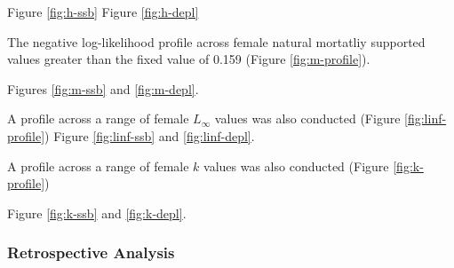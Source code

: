 \documentclass[11pt,
  english,
  a4paper,
]{article}
\begin{document}

Figure \ref{fig:h-ssb} Figure \ref{fig:h-depl}

\leavevmode\tagmcend\tagstructend\par


The negative log-likelihood profile across female natural mortatliy supported values greater than the fixed value of 0.159 (Figure \ref{fig:m-profile}).

\leavevmode\tagmcend\tagstructend\par


Figures \ref{fig:m-ssb} and \ref{fig:m-depl}.

\leavevmode\tagmcend\tagstructend\par


A profile across a range of female {\(L_{\infty}\)\leavevmode\tagmcend\tagstructend} values was also conducted (Figure \ref{fig:linf-profile}) Figure \ref{fig:linf-ssb} and \ref{fig:linf-depl}.

\leavevmode\tagmcend\tagstructend\par


A profile across a range of female {\(k\)\leavevmode\tagmcend\tagstructend} values was also conducted (Figure \ref{fig:k-profile})

\leavevmode\tagmcend\tagstructend\par


Figure \ref{fig:k-ssb} and \ref{fig:k-depl}.

\leavevmode\tagmcend\tagstructend\par


\hypertarget{retrospective-analysis}{%
\subsubsection{Retrospective Analysis}\label{retrospective-analysis}}

\leavevmode\tagmcend\tagstructend
\end{document}
